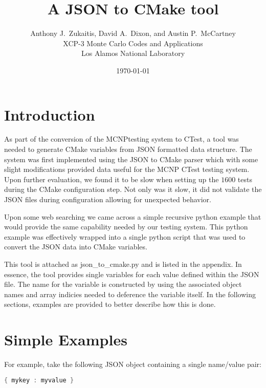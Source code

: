 \documentclass[12pt]{article}
\title{A JSON to CMake tool}
\author{ Anthony J.\ Zukaitis, David A.\ Dixon, and Austin P.\ McCartney \\
         XCP-3 Monte Carlo Codes and Applications \\
	 Los Alamos National Laboratory }
\date{\today}
\begin{document}
\maketitle

\section{Introduction}

As part of the conversion of the MCNP\textregistered testing system to CTest\cite{mcnpctest}, a tool was needed to generate CMake variables
from JSON formatted data structure.  The system was first implemented using the JSON to CMake parser \cite{jsoncmake} which with some slight modifications provided data useful for the MCNP CTest testing system.  Upon further evaluation, we found it to be slow when setting up the $1600$ tests during the CMake configuration step.  Not only was it slow, it did not validate the JSON files during configuration allowing for unexpected behavior.   

Upon some web searching we came across a simple recursive python example that would provide the same capability needed by our testing system\cite{flatten}.  This python example was effectively wrapped into a single python script that was used to convert the JSON data into CMake variables.

This tool is attached as json\_to\_cmake.py and is listed in the appendix.  In essence, the tool provides single variables for each value defined within the JSON file. The name for the variable is constructed by using the associated object names and array indicies needed to deference the variable itself.  In the following sections, examples are provided to better describe how this is done.

\section{Simple Examples}
For example, take the following JSON object containing a single name/value pair:
\begin{lstlisting}[language=java,basicstyle=\small,frame=single,columns=fullflexible]
{ mykey : myvalue }
\end{lstlisting}
\end{document}
